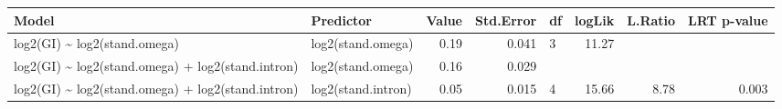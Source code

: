 \begin{table}[ht]
\centering
\begin{tabular}{llrrlrrr}
  \hline
Model & Predictor & Value & Std.Error & df & logLik & L.Ratio & LRT p-value \\ 
  \hline
log2(GI) \~{} log2(stand.omega) & log2(stand.omega) & 0.19 & 0.041 & 3 & 11.27 &  &  \\ 
  log2(GI) \~{} log2(stand.omega) + log2(stand.intron) & log2(stand.omega) & 0.16 & 0.029 &  &  &  &  \\ 
  log2(GI) \~{} log2(stand.omega) + log2(stand.intron) & log2(stand.intron) & 0.05 & 0.015 & 4 & 15.66 & 8.78 & 0.003 \\ 
   \hline
\end{tabular}
\end{table}
